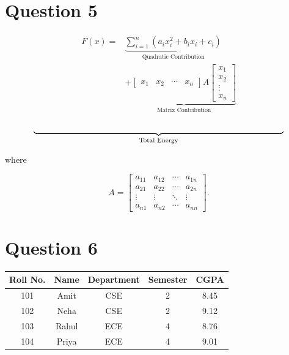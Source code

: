\documentclass[12pt,a4paper]{article}
\begin{document}
	\section*{Question 5}
	
	\[
	\begin{aligned}
		F(x) = {} &
		\underbrace{
			\sum_{i=1}^{n}
			(a_i x_i^2 + b_i x_i + c_i)
		}_{\text{Quadratic Contribution}}
		\\
		&+
		\underbrace{
			\begin{bmatrix}
				x_1 & x_2 & \cdots & x_n
			\end{bmatrix}
			A
			\begin{bmatrix}
				x_1 \\ x_2 \\ \vdots \\ x_n
			\end{bmatrix}
		}_{\text{Matrix Contribution}}
	\end{aligned}
	\]
	
	\[
	\underbrace{\hspace{0.85\textwidth}}_{\text{Total Energy}}
	\]
	
	where
	
	\[
	A =
	\begin{bmatrix}
		a_{11} & a_{12} & \cdots & a_{1n} \\
		a_{21} & a_{22} & \cdots & a_{2n} \\
		\vdots & \vdots & \ddots & \vdots \\
		a_{n1} & a_{n2} & \cdots & a_{nn}
	\end{bmatrix}.
	\]
	
	\section*{Question 6}
	
	\begin{center}
		\begin{tabular}{|c|c|c|c|c|}
			\hline
			\textbf{Roll No.} &
			\textbf{Name} &
			\textbf{Department} &
			\textbf{Semester} &
			\textbf{CGPA} \\
			\hline
			101 & Amit   & CSE & 2 & 8.45 \\
			\hline
			102 & Neha   & CSE & 2 & 9.12 \\
			\hline
			103 & Rahul  & ECE & 4 & 8.76 \\
			\hline
			104 & Priya  & ECE & 4 & 9.01 \\
			\hline
		\end{tabular}
	\end{center}
	
\end{document}
